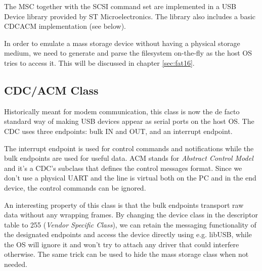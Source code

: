 




The \gls{MSC} together with the \gls{SCSI} command set are implemented in a \gls{USB} Device library provided by ST Microelectronics. The library also includes a basic \gls{CDCACM} implementation (see below).

In order to emulate a mass storage device without having a physical storage medium, we need to generate and parse the filesystem on-the-fly as the host \gls{OS} tries to access it. This will be discussed in chapter \ref{sec:fat16}.

\subsection{CDC/ACM Class} \label{sec:cdc-acm}


Historically meant for modem communication, this class is now the de facto standard way of making \gls{USB} devices appear as serial ports on the host \gls{OS}. The \gls{CDC} uses three endpoints: bulk IN and OUT, and an interrupt endpoint. 

The interrupt endpoint is used for control commands and notifications while the bulk endpoints are used for useful data. \gls{ACM} stands for \textit{Abstract Control Model} and it's a \gls{CDC}'s subclass that defines the control messages format. Since we don't use a physical UART and the line is virtual both on the PC and in the end device, the control commands can be ignored.

An interesting property of this class is that the bulk endpoints transport raw data without any wrapping frames. By changing the device class in the descriptor table to 255 (\textit{Vendor Specific Class}), we can retain the messaging functionality of the designated endpoints and access the device directly using e.g. libUSB, while the \gls{OS} will ignore it and won't try to attach any driver that could interfere otherwise. The same trick can be used to hide the mass storage class when not needed.

